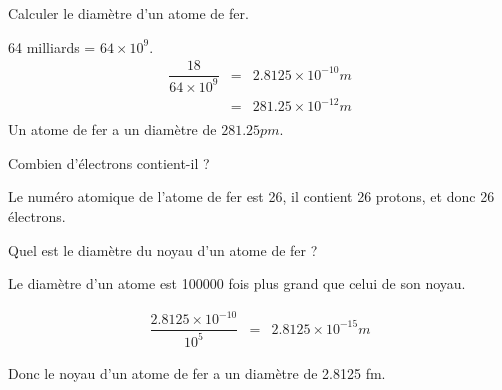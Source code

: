 \begin{questions}
	\question[2] Calculer le diamètre d'un atome de fer.
	\begin{solution}
		64 milliards  = $64 \times 10^9$.
		\begin{eqnarray*}
			\dfrac{18}{64 \times 10^9}& = & \num{2.8125} \times 10^{-10} m \\
			& = & \num{281.25} \times 10^{-12} m \\
		\end{eqnarray*}
	Un atome de fer a un diamètre de $\num{281.25} pm$.
	\end{solution}
	  
	
	\question[1] Combien d'électrons contient-il ?
	\begin{solution}
		Le numéro atomique de l'atome de fer est 26, il contient 26 protons, et donc 26 électrons.
	\end{solution}
	
	\question[2] Quel est le diamètre du noyau d'un atome de fer ?
	\begin{solution}
		Le diamètre d'un atome est \num{100000} fois plus grand que celui de son noyau.
		
		\begin{eqnarray*}
			\dfrac{\num{2.8125} \times 10^{-10}}{10^5}& = & \num{2.8125} \times 10^{-15} m
		\end{eqnarray*}
	
	Donc le noyau d'un atome de fer a un diamètre de \num{2.8125} fm.
	\end{solution}
\end{questions}

